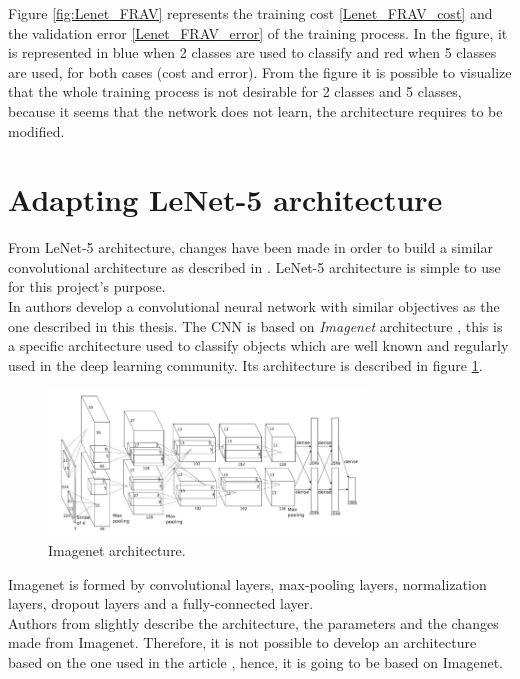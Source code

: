 Figure \ref{fig:Lenet_FRAV} represents the training cost \ref{Lenet_FRAV_cost} and the validation error \ref{Lenet_FRAV_error} of the training process. In the figure, it is represented in blue when 2 classes are used to classify and red when 5 classes are used, for both cases (cost and error). From the figure it is possible to visualize that the whole training process is not desirable for 2 classes and 5 classes, because it seems that the network does not learn, the architecture requires to be modified.


\section{Adapting LeNet-5 architecture} \label{sec:adapt_lenet}
From LeNet-5 architecture, changes have been made in order to build a similar convolutional architecture as described in \cite{yangLL14}. LeNet-5 architecture is simple to use  for this project’s purpose.\\

In \cite{yangLL14} authors develop a convolutional neural network with similar objectives as the one described in this thesis. The CNN is based on \textit{Imagenet} architecture \cite{imagenet}, this is a specific architecture used to classify objects which are well known and regularly used in the deep learning community. Its architecture is described in figure \ref{fig:Imagenet_architecture}.\\

\begin{figure}[tb]
\centering
\includegraphics[width=0.75\textwidth]{images_miscelaneus/Imagenet.png}
\caption{Imagenet architecture.} \label{fig:Imagenet_architecture}
\end{figure}

Imagenet is formed by convolutional layers, max-pooling layers, normalization layers, dropout layers and a fully-connected layer.\\

Authors from \cite{yangLL14} slightly describe the architecture, the parameters and the changes made from Imagenet. Therefore, it is not possible to develop an architecture based on the one used in the article \cite{yangLL14}, hence, it is going to be based on Imagenet.\\

